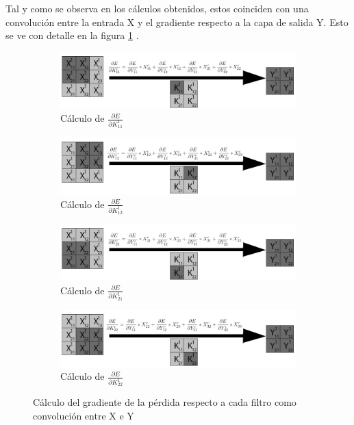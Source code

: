 Tal y como se observa en los cálculos obtenidos, estos coinciden con una convolución entre la entrada X y el gradiente respecto a la capa de salida Y. Esto se ve con detalle en la figura \ref{fig:conv_backprop_como_convolucion_X_Y} \cite{conv_backprop}.

\begin{figure}[H]
	\centering
	\begin{subfigure}{.5\textwidth}
		\hspace{-25mm}
		\includegraphics[width=1.4\linewidth]{imagenes/conv_backprop_1.jpg}  
		\caption{Cálculo de $\frac{\partial E}{\partial K^1_{11}}$}
	\end{subfigure}%
	\begin{subfigure}{.5\textwidth}
		\hspace{5mm}
		\includegraphics[width=1.4\linewidth]{imagenes/conv_backprop_2.jpg}  
		\caption{Cálculo de $\frac{\partial E}{\partial K^1_{12}}$}
	\end{subfigure}
	\vspace{5mm}
	\begin{subfigure}{.5\textwidth}
	\hspace{-25mm}
	\includegraphics[width=1.4\linewidth]{imagenes/conv_backprop_3.jpg}  
	\caption{Cálculo de $\frac{\partial E}{\partial K^1_{21}}$}
	\end{subfigure}%
	\begin{subfigure}{.5\textwidth}
	\hspace{5mm}
	\includegraphics[width=1.4\linewidth]{imagenes/conv_backprop_4.jpg}  
	\caption{Cálculo de $\frac{\partial E}{\partial K^1_{22}}$}
	\end{subfigure}
	\caption{Cálculo del gradiente de la pérdida respecto a cada filtro como convolución entre X e Y}
	\label{fig:conv_backprop_como_convolucion_X_Y}
\end{figure}

